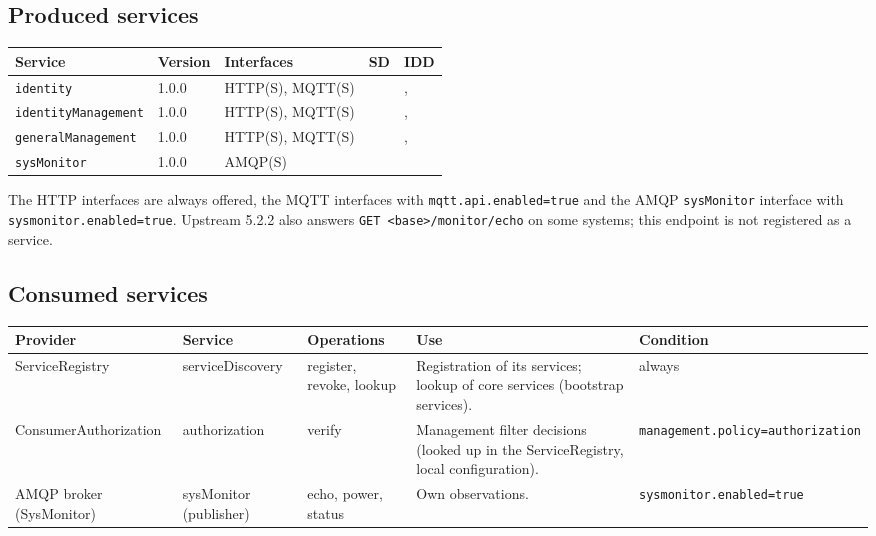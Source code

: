 \documentclass[a4paper]{arrowhead}
\begin{document}
\subsection{Produced services}

\noindent\begin{longtable}{| p{5.3cm} | p{1.3cm} | p{2.6cm} | p{1.6cm} | p{3.6cm} |} \hline
\rowcolor{gray!33} Service & Version & Interfaces & SD & IDD \\ \hline \endhead
\texttt{identity} & 1.0.0 & HTTP(S), MQTT(S) & \cite{auth-identity-sd} & \cite{auth-identity-http-idd}, \cite{auth-identity-mqtt-idd} \\ \hline
\texttt{identityManagement} & 1.0.0 & HTTP(S), MQTT(S) & \cite{auth-identityManagement-sd} & \cite{auth-identityManagement-http-idd}, \cite{auth-identityManagement-mqtt-idd} \\ \hline
\texttt{generalManagement} & 1.0.0 & HTTP(S), MQTT(S) & \cite{auth-generalManagement-sd} & \cite{auth-generalManagement-http-idd}, \cite{auth-generalManagement-mqtt-idd} \\ \hline
\texttt{sysMonitor} & 1.0.0 & AMQP(S) & \cite{auth-sysMonitor-sd} & \cite{auth-sysMonitor-amqp-idd} \\ \hline
\end{longtable}

The HTTP interfaces are always offered, the MQTT interfaces with \texttt{mqtt.api.enabled=true} and the AMQP \texttt{sysMonitor} interface with \texttt{sysmonitor.enabled=true}. Upstream 5.2.2 also answers \texttt{GET <base>/monitor/echo} on some systems; this endpoint is not registered as a service.

\subsection{Consumed services}

\noindent\begin{longtable}{| >{\raggedright\arraybackslash}p{2.9cm} | >{\raggedright\arraybackslash}p{3.1cm} | >{\raggedright\arraybackslash}p{2.5cm} | p{3.6cm} | >{\raggedright\arraybackslash}p{2.9cm} |} \hline
\rowcolor{gray!33} Provider & Service & Operations & Use & Condition \\ \hline \endhead
ServiceRegistry & serviceDiscovery & register, revoke, lookup & Registration of its services; lookup of core services (bootstrap services). & always \\ \hline
Consumer\allowbreak{}Authorization & authorization & verify & Management filter decisions (looked up in the ServiceRegistry, local configuration). & \texttt{management.\allowbreak{}policy=\allowbreak{}authorization} \\ \hline
AMQP broker (SysMonitor) & sysMonitor (publisher) & echo, power, status & Own observations. & \texttt{sysmonitor.\allowbreak{}enabled=\allowbreak{}true} \\ \hline
\end{longtable}
\end{document}
